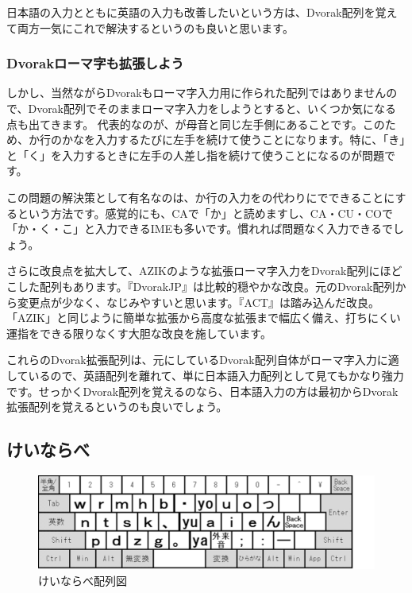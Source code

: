 日本語の入力とともに英語の入力も改善したいという方は、Dvorak配列を覚えて両方一気にこれで解決するというのも良いと思います。

\subsubsection*{Dvorakローマ字も拡張しよう}

しかし、当然ながらDvorakもローマ字入力用に作られた配列ではありませんので、Dvorak配列でそのままローマ字入力をしようとすると、いくつか気になる点も出てきます。
代表的なのが、が母音と同じ左手側にあることです。このため、か行のかなを入力するたびに左手を続けて使うことになります。特に、「き」と「く」を入力するときに左手の人差し指を続けて使うことになるのが問題です。

この問題の解決策として有名なのは、か行の入力をの代わりにでできることにするという方法です。感覚的にも、CAで「か」と読めますし、CA・CU・COで「か・く・こ」と入力できるIMEも多いです。慣れれば問題なく入力できるでしょう。

さらに改良点を拡大して、AZIKのような拡張ローマ字入力をDvorak配列にほどこした配列もあります。『DvorakJP』は比較的穏やかな改良。元のDvorak配列から変更点が少なく、なじみやすいと思います。『ACT』は踏み込んだ改良。「AZIK」と同じように簡単な拡張から高度な拡張まで幅広く備え、打ちにくい運指をできる限りなくす大胆な改良を施しています。

これらのDvorak拡張配列は、元にしているDvorak配列自体がローマ字入力に適しているので、英語配列を離れて、単に日本語入力配列として見てもかなり強力です。せっかくDvorak配列を覚えるのなら、日本語入力の方は最初からDvorak拡張配列を覚えるというのも良いでしょう。

\subsection{けいならべ}


\begin{figure}
 \begin{center}
   \includegraphics[width=14cm,clip]{res_kouy/keinarabe.eps}
 \end{center}
 \caption{けいならべ配列図}
 \label{keinarabe}
\end{figure}

